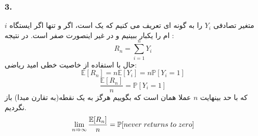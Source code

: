 \documentclass[]{article}
\begin{document}
\subsubsection{3.}
متغیر تصادفی 
$Y_i$
را به گونه ای تعریف می کنیم که یک است، اگر و تنها اگر ایستگاه $i$ ام را یکبار ببینیم و در غیر اینصورت صفر است. در نتیجه :
\begin{equation}
	\nonumber
	R_n = \sum_{i = 1}^{n} Y_i
\end{equation}
حال با استفاده از خاصیت خطی امید ریاضی:
\begin{equation}
	\nonumber
	\mathbb{E}[R_n] = n\mathbb{E}[Y_i] = n \mathbb{P}[Y_i = 1]
\end{equation}
\begin{equation}
	\nonumber
	\frac{\mathbb{E}[R_n]}{n} = \mathbb{P}[Y_i = 1]
\end{equation}
که با حد بینهایت $n$ عملا همان است که بگوییم هرگز به یک نقطه(به تقارن مبدا) باز نگردیم.
\begin{equation}
	\nonumber
	\lim_{n\Rightarrow \infty} \frac{\mathbb{E}[R_n]}{n} = \mathbb{P}[never\hspace{0.1cm}returns\hspace{0.1cm}to\hspace{0.1cm}zero]
\end{equation}
\newpage
\end{document}
